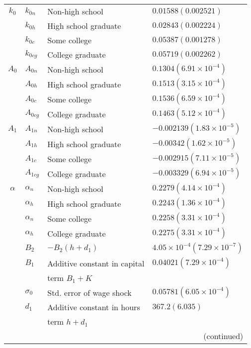 \documentclass[10pt, letterpaper]{article}
\begin{document}
\begin{center}
\begin{table}
\begin{tabular}{c l l l}
    $k_0$ &   $ k_{0n} $ &   Non-high school  &  $ 0.01588 (0.002521)$\\
    {} &   $ k_{0h} $&  High school graduate  &  $ 0.02843 (0.002224)$\\
    {} &   $ k_{0c}$ &  Some college  &  $0.05387 (0.001278) $\\
    {} &   $ k_{0cg}$&  College graduate  & $ 0.05719 (0.002262)$ \\

    $A_0$ &   $ A_{0n} $ &   Non-high school  & $ 0.1304 (6.91  \times 10^{-4})$ \\
    {} &   $ A_{0h} $&  High school graduate  &  $0.1513 (3.15  \times 10^{-4}) $\\
    {} &   $ A_{0c}$ &  Some college  &  $ 0.1536 (6.59  \times 10^{-4})$\\
    {} &   $ A_{0cg}$&  College graduate  & $0.1463 (5.12  \times 10^{-4}) $ \\
    
    $A_1$ &   $ A_{1n} $ &   Non-high school  & $-0.002139 (1.83  \times 10^{-5}) $ \\
    {} &   $ A_{1h} $&  High school graduate  &  $ -0.00342 (1.62  \times 10^{-5})$\\
    {} &   $ A_{1c}$ &  Some college  &  $-0.002915 (7.11  \times 10^{-5}) $\\
    {} &   $ A_{1cg}$&  College graduate  & $-0.003329 (6.94  \times 10^{-5}) $ \\
    
    $\alpha$ &   $\alpha_n $ &   Non-high school  &  $ 0.2279 (4.14 \times 10^{-4})$\\
    {} &   $ \alpha_h $&  High school graduate  &  $0.2243 (1.36  \times 10^{-4}) $\\
    {} &   $ \alpha_n$ &  Some college  & $ 0.2258 (3.31  \times 10^{-4})$ \\
    {} &   $\alpha_h $&  College graduate  &  $ 0.2275 (3.31  \times 10^{-4})$\\
    {} &   $B_2$ &  $-B_2(h+d_1)$  &  $4.05  \times 10^{-4} (7.29  \times 10^{-7}) $\\
    {} &   $B_1$  & Additive constant in capital &  $ 0.04021 (7.29  \times 10^{-4})$\\
      {} & {} &  term $B_1+K$   & {} \\
    {} &   $\sigma_0$ &  Std. error of wage shock  &  $0.05781 (6.05  \times 10^{-4}) $\\
    {} &   $d_1$  &  Additive constant in hours &  $367.2 (6.035) $\\
     {} & {} &  term $h+d_1$  & {} \\
     \hline
        {} & {} &  \multicolumn{2}{r}{ (continued)} \\
  \end{tabular}
 \label{fig:EstimationResults}
\end{table}
\end{center}
\end{document}
